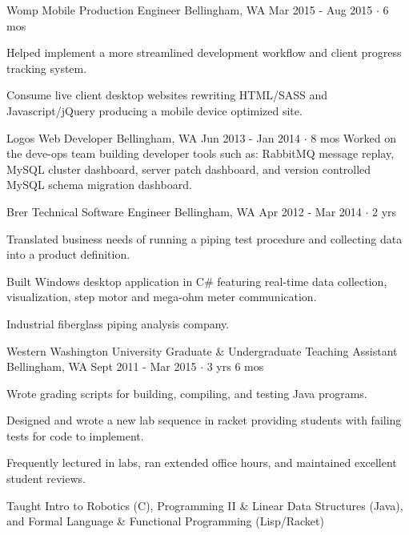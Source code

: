 \documentclass[11pt, a4paper]{awesome-cv}
\begin{document}
\begin{cventries}
  \cventry
    {Womp Mobile} %
    {Production Engineer} %
    {Bellingham, WA} %
    {Mar 2015 - Aug 2015  $\cdot$ 6 mos} %
    {
      \begin{cvitems} %
        \item Helped implement a more streamlined development workflow and client progress tracking system.
      \end{cvitems}
    }
    {Consume live client desktop websites rewriting HTML/SASS and Javascript/jQuery producing a mobile device optimized site.}

  \cventry
    {Logos} %
    {Web Developer} %
    {Bellingham, WA} %
    {Jun 2013 - Jan 2014  $\cdot$ 8 mos} %
    {
    }
    {Worked on the deve-ops team building developer tools such as: RabbitMQ message replay, MySQL cluster dashboard, server patch dashboard, and version controlled MySQL schema migration dashboard.}

  \cventry
    {Brer Technical} %
    {Software Engineer} %
    {Bellingham, WA} %
    {Apr 2012 - Mar 2014  $\cdot$ 2 yrs} %
    {
      \begin{cvitems} %
        \item Translated business needs of running a piping test procedure and collecting data into a product definition.
        \item Built Windows desktop application in C\# featuring real-time data collection, visualization, step motor and mega-ohm meter communication.
      \end{cvitems}
    }
    {Industrial fiberglass piping analysis company.}

  \cventry
    {Western Washington University} %
    {Graduate \& Undergraduate Teaching Assistant} %
    {Bellingham, WA} %
    {Sept 2011 - Mar 2015  $\cdot$ 3 yrs 6 mos} %
    {
      \begin{cvitems} %
        \item Wrote grading scripts for building, compiling, and testing Java programs.
        \item Designed and wrote a new lab sequence in racket providing students with failing tests for code to implement.
        \item Frequently lectured in labs, ran extended office hours, and maintained excellent student reviews.
      \end{cvitems}
    }
    {Taught Intro to Robotics (C), Programming II \& Linear Data Structures (Java), and Formal Language \& Functional Programming (Lisp/Racket)}

\end{cventries}
\end{document}
